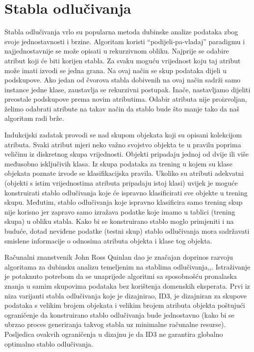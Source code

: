 \section{Stabla odlučivanja}
\label{ch:ch4}

Stabla odlučivanja vrlo su popularna metoda dubinske analize podataka zbog svoje jednostavnosti i brzine. Algoritam koristi “podijeli-pa-vladaj” paradigmu i najjednostavnije se može opisati u rekurzivnom obliku. Najprije se odabire atribut koji će biti korijen stabla. Za svaku moguću vrijednost koju taj atribut može imati izvodi se jedna grana. Na ovaj način se skup podataka dijeli u podskupove. Ako jedan od čvorova stabla dobivenih na ovaj način sadrži samo instance jedne klase, zaustavlja se rekurzivni postupak. Inače, nastavljamo dijeliti preostale podskupove prema novim atributima. Odabir atributa nije proizvoljan, želimo odabrati atribute na takav način da stablo bude što manje tako da naš algoritam radi brže. 

Indukcijski zadatak provodi se nad skupom objekata koji su opisani kolekcijom atributa. Svaki atribut mjeri neko važno svojstvo objekta te u pravilu poprima veličinu iz diskretnog skupa vrijednosti. Objekti pripadaju jednoj od dvije ili više međusobno isključivih klasa. Iz skupa podataka za trening u kojem su klase objekata poznate izvode se klasifikacijska pravila. Ukoliko su atributi adekvatni (objekti s istim vrijednostima atributa pripadaju istoj klasi) uvijek je moguće konstruirati stablo odlučivanja koje će ispravno klasificirati sve objekte u trening skupu\cite{Witten01}. 
Međutim, stablo odlučivanja koje ispravno klasificira samo trening skup nije korisno jer zapravo samo izražava podatke koje imamo u tablici (trening skupa) u obliku stabla. Kako bi se  konstruirano stablo moglo primjeniti i na buduće, dotad neviđene podatke (testni skup) stablo odlučivanja mora sadržavati smislene informacije o odnosima atributa objekta i klase tog objekta. 

Računalni znanstvenik John Ross Quinlan dao je značajan doprinos razvoju algoritama za dubinsku analizu temeljenim na stablima odlučivanja\cite{Quinlan01},\cite{Quinlan02},\cite{Wu01}. Istraživanje je potaknuto potrebom da se unaprijede algoritmi sa sposobnošću pronalaska znanja u samim skupovima podataka bez korištenja domenskih eksperata. Prvi iz niza varijanti stabla odlučivanja koje je dizajnirao, ID3, je dizajniran za skupove podataka s velikim brojem objekata i velikim brojem atributa objekta poštujući ograničenje da konstruirano stablo odlučivanja bude jednostavno (kako bi se ubrzao proces generiranja takvog stabla uz minimalne računalne resurse). Posljedica ovakvih ograničenja u dizajnu je da ID3 ne garantira globalno optimalno stablo odlučivanja\cite{Quinlan02}.

